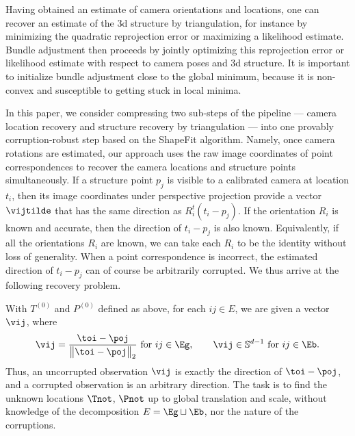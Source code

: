 Having obtained an estimate of camera orientations and locations, one can recover an estimate of the 3d structure by triangulation, for instance by minimizing the quadratic reprojection error or maximizing a likelihood estimate. Bundle adjustment then proceeds by jointly optimizing this reprojection error or likelihood estimate with respect to camera poses and 3d structure. It is important to initialize bundle adjustment close to the global minimum, because it is  non-convex and susceptible to getting stuck in local minima.  

In this paper, we consider compressing two sub-steps of the pipeline --- camera location recovery and structure recovery by triangulation --- into one provably corruption-robust step based on the ShapeFit algorithm. Namely, once camera rotations are estimated, our approach uses the raw image coordinates of point correspondences to recover the camera locations and structure points simultaneously.  If a structure point $p_j$ is visible to a calibrated camera at location $t_i$, then its image coordinates under perspective projection provide a vector $\vijtilde $ that has the same direction as $R_i^t(t_i - p_j)$.  If the orientation $R_i$ is known and accurate, then the direction of $t_i - p_j$ is also known.  Equivalently,  if all the orientations $R_i$ are known, we can take each $R_i$ to be the identity without loss of generality. When a point correspondence is incorrect, the estimated direction of $t_i-p_j$ can of course be arbitrarily corrupted. We thus arrive at the following recovery problem.

 
With $T^{(0)}$ and $P^{(0)}$ defined as above, for each $ij \in E$, we are given a vector $\vij$, where
\begin{align}
\vij = \frac{\toi - \poj}{\bigl\| \toi - \poj \bigr\|_2} \text{ for } ij \in \Eg, \qquad \vij \in \mathbb{S}^{d-1} \text{ for } ij \in \Eb.  \label{location-recovery-measurements}
\end{align}
Thus, an uncorrupted observation $\vij$ is exactly the direction of $\toi - \poj$, and a corrupted observation is an arbitrary direction. The task is to find the unknown locations $\Tnot$, $\Pnot$ up to global translation and scale, without knowledge of the decomposition $E = \Eg \sqcup \Eb$, nor the nature of the corruptions.

